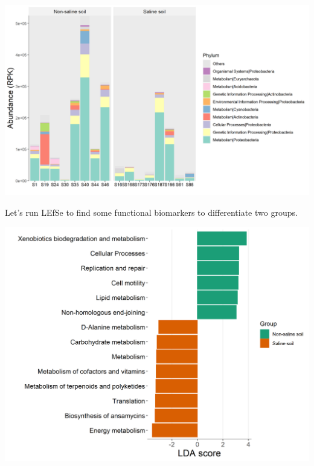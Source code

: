 \documentclass[
]{book}
\newenvironment{Shaded}{\begin{snugshade}}{\end{snugshade}}
\newcommand{\AttributeTok}[1]{\textcolor[rgb]{0.77,0.63,0.00}{#1}}
\newcommand{\CommentTok}[1]{\textcolor[rgb]{0.56,0.35,0.01}{\textit{#1}}}
\newcommand{\ConstantTok}[1]{\textcolor[rgb]{0.00,0.00,0.00}{#1}}
\newcommand{\DecValTok}[1]{\textcolor[rgb]{0.00,0.00,0.81}{#1}}
\newcommand{\FunctionTok}[1]{\textcolor[rgb]{0.00,0.00,0.00}{#1}}
\newcommand{\NormalTok}[1]{#1}
\newcommand{\OtherTok}[1]{\textcolor[rgb]{0.56,0.35,0.01}{#1}}
\newcommand{\SpecialCharTok}[1]{\textcolor[rgb]{0.00,0.00,0.00}{#1}}
\newcommand{\StringTok}[1]{\textcolor[rgb]{0.31,0.60,0.02}{#1}}
\begin{document}
\begin{center}\includegraphics[width=800px]{Images/plot_HUMANN_KEGG_bar_taxafunc} \end{center}

Let's run LEfSe to find some functional biomarkers to differentiate two groups.

\begin{Shaded}
\end{Shaded}

\begin{center}\includegraphics[width=700px]{Images/plot_HUMANN_KEGG_lefse_bar} \end{center}
\end{document}
